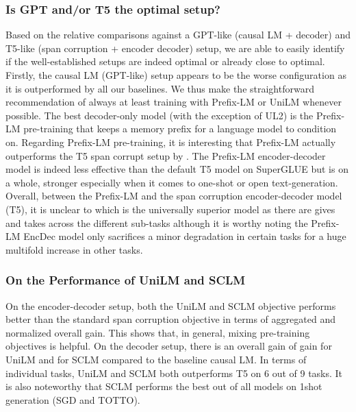 \documentclass[10pt]{article}
\begin{document}
\subsubsection{Is GPT and/or T5 the optimal setup?}
Based on the relative comparisons against a GPT-like (causal LM + decoder) and T5-like (span corruption + encoder decoder) setup, we are able to easily identify if the well-established setups are indeed optimal or already close to optimal. Firstly, the causal LM (GPT-like) setup appears to be the worse configuration as it is outperformed by all our baselines. We thus make the straightforward recommendation of always at least training with Prefix-LM or UniLM whenever possible. The best decoder-only model (with the exception of UL2) is the Prefix-LM pre-training that keeps a memory prefix for a language model to condition on. Regarding Prefix-LM pre-training, it is interesting that Prefix-LM actually outperforms the T5 span corrupt setup by . The Prefix-LM encoder-decoder model is indeed less effective than the default T5 model on SuperGLUE but is on a whole, stronger especially when it comes to one-shot or open text-generation. Overall, between the Prefix-LM and the span corruption encoder-decoder model (T5), it is unclear to which is the universally superior model as there are gives and takes across the different sub-tasks although it is worthy noting the Prefix-LM EncDec model only sacrifices a minor degradation in certain tasks for a huge multifold increase in other tasks. 

\subsubsection{On the Performance of UniLM and SCLM}
On the encoder-decoder setup, both the UniLM and SCLM objective performs better than the standard span corruption objective in terms of aggregated and normalized overall gain. This shows that, in general, mixing pre-training objectives is helpful. On the decoder setup, there is an overall gain of  gain for UniLM and  for SCLM compared to the baseline causal LM. In terms of individual tasks, UniLM and SCLM both outperforms T5 on 6 out of 9 tasks. It is also noteworthy that SCLM performs the best out of all models on 1shot generation (SGD and TOTTO). 
\end{document}
